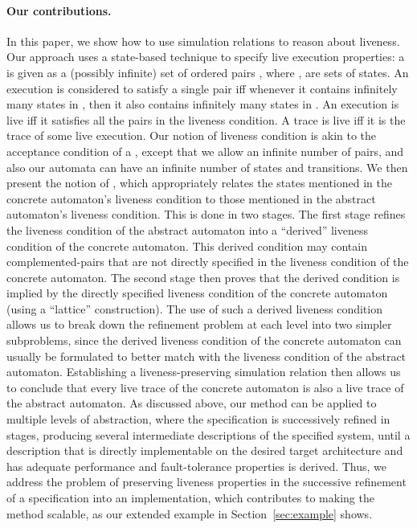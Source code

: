 \documentclass[11pt]{article}
\begin{document}
\paragraph{Our contributions.}
In this paper, we show how to use simulation relations to reason about
liveness.
Our approach uses a state-based technique to specify live execution 
properties: a  is given as a (possibly infinite) set
of ordered pairs , where , 
are sets of states.
An execution is considered to satisfy a single pair
 iff whenever it contains infinitely many states
in , then it also contains infinitely many states 
in .  An execution is live iff it satisfies all the pairs
in the liveness condition. A trace is live iff it is the trace of some
live execution.
Our notion of liveness condition is akin to the acceptance condition
of a 
\cite{AH95,EL85,GL94}, except that we allow an infinite number of pairs,
and also our automata can have an infinite number of states and
transitions. 
We then present the notion of , which appropriately relates the states mentioned in the
concrete automaton's liveness condition to those mentioned in the
abstract automaton's liveness condition.  This is done in two stages.
The first stage refines the liveness condition of the abstract
automaton into a ``derived'' liveness condition of the concrete
automaton.  This derived condition may contain complemented-pairs that
are not directly specified in the liveness condition of the concrete
automaton.  The second stage then proves that the derived condition is
implied by the directly specified liveness condition of the concrete
automaton (using a ``lattice'' construction).  
The use of such a derived liveness condition allows us to
break down the refinement problem at each level into two simpler
subproblems, since the derived liveness condition of the concrete
automaton can usually be formulated to better match with the
liveness condition of the abstract automaton.
Establishing a liveness-preserving simulation relation then allows us
to conclude that every live trace of the concrete automaton is also a
live trace of the abstract automaton.
As discussed above, our method can be applied to multiple levels of
abstraction, where the specification is successively refined in
stages, producing several intermediate descriptions of the specified
system, until a description that is directly implementable on the
desired target architecture and has adequate performance and
fault-tolerance properties is derived.
Thus, we address the problem of preserving liveness properties in the
successive refinement of a specification into an implementation,
which contributes to making the method scalable, as our 
extended example in Section~\ref{sec:example} shows.
\end{document}
